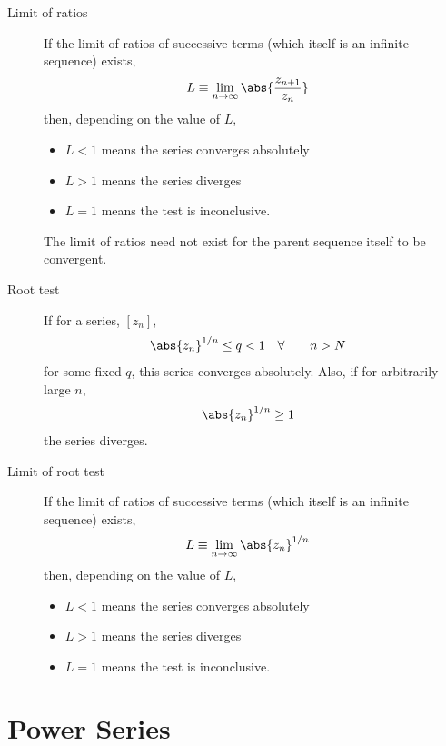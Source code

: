 \begin{description}
    \item[Limit of ratios] If the limit of ratios of successive terms (which
        itself is an infinite sequence) exists,
        \begin{align}
            L & \equiv \lim_{n \to \infty} \abs{\frac{z_{n+1}}{z_n}}
        \end{align}
        then, depending on the value of $ L $,
        \begin{itemize}
            \item $ L < 1 $ means the series converges absolutely
            \item $ L > 1 $ means the series diverges
            \item $ L = 1 $ means the test is inconclusive.
        \end{itemize}

        The limit of ratios need not exist for the parent sequence itself to be
        convergent.

    \item[Root test] If for a series, $[z_n]$,
        \begin{align}
            \abs{z_n}^{1/n}  & \leq q < 1 &
            \forall \qquad n & > N
        \end{align}
        for some fixed $ q $, this series converges absolutely. Also,
        if for arbitrarily large $ n $,
        \begin{align}
            \abs{z_n}^{1/n} & \geq 1
        \end{align}
        the series diverges.

    \item[Limit of root test] If the limit of ratios of successive terms (which itself is an infinite
        sequence) exists,
        \begin{align}
            L & \equiv \lim_{n \to \infty} \abs{z_n}^{1/n}
        \end{align}
        then, depending on the value of $ L $,
        \begin{itemize}
            \item $ L < 1 $ means the series converges absolutely
            \item $ L > 1 $ means the series diverges
            \item $ L = 1 $ means the test is inconclusive.
        \end{itemize}
\end{description}

\section{Power Series}

